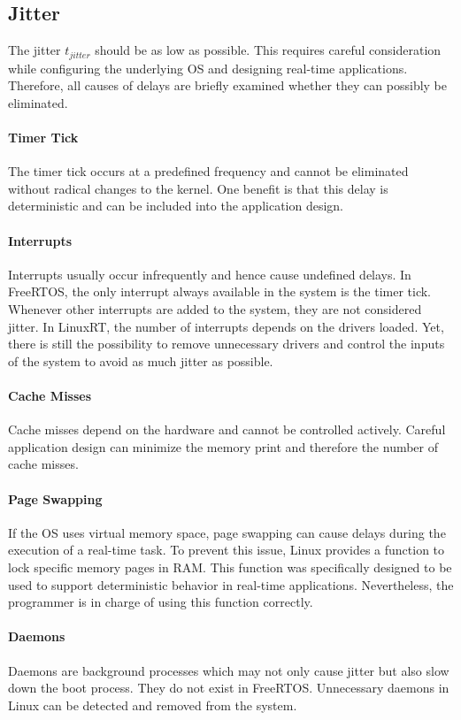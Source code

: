\subsection{Jitter}
The jitter $ t_{jitter} $ should be as low as possible. 
This requires careful consideration while configuring the underlying \ac{OS} and designing real-time applications.
Therefore, all causes of delays are briefly examined whether they can possibly be eliminated.

\paragraph{Timer Tick} 
The timer tick occurs at a predefined frequency and cannot be eliminated without radical changes to the kernel.
One benefit is that this delay is deterministic and can be included into the application design. 

\paragraph{Interrupts}
Interrupts usually occur infrequently and hence cause undefined delays. 
In FreeRTOS, the only interrupt always available in the system is the timer tick.
Whenever other interrupts are added to the system, they are not considered jitter.
In LinuxRT, the number of interrupts depends on the drivers loaded. 
Yet, there is still the possibility to remove unnecessary drivers and control the inputs of the system to avoid as much jitter as possible.

\paragraph{Cache Misses}
Cache misses depend on the hardware and cannot be controlled actively.
Careful application design can minimize the memory print and therefore the number of cache misses.

\paragraph{Page Swapping}
If the \ac{OS} uses virtual memory space, page swapping can cause delays during the execution of a real-time task.
To prevent this issue, Linux provides a function to lock specific memory pages in \ac{RAM}.
This function was specifically designed to be used to support deterministic behavior in real-time applications.
Nevertheless, the programmer is in charge of using this function correctly.

\paragraph{Daemons}
Daemons are background processes which may not only cause jitter but also slow down the boot process. 
They do not exist in FreeRTOS.
Unnecessary daemons in Linux can be detected and removed from the system.

